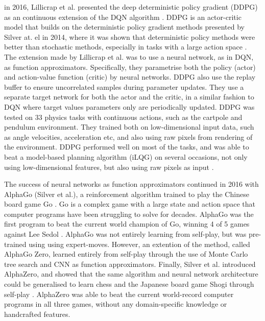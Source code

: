 \documentclass[class=book, crop=false]{standalone}
\begin{document}
in 2016, Lillicrap et al. presented the deep deterministic policy gradient (DDPG) as an continuous extension of the DQN algorithm  \cite{DBLP:journals/corr/LillicrapHPHETS15}. DDPG is an actor-critic model that builds on the deterministic policy gradient methods presented by Silver at. el in 2014, where it was shown that deterministic policy methods were better than stochastic methods, especially in tasks with a large action space \cite{pmlr-v32-silver14}. The extension made by Lillicrap et al. was to use a neural network, as in DQN, as function approximators. Specifically, they parametrise both the policy (actor) and action-value function (critic) by neural networks. DDPG also use the replay buffer to ensure uncorrelated samples during parameter updates. They use a separate target network for both the actor and the critic, in a similar fashion to DQN where target values parameters only are periodically updated. DDPG was tested on 33 physics tasks with continuous actions, such as the cartpole and pendulum  environment. They trained both on low-dimensional input data, such as angle velocities, acceleration etc, and also using raw pixels from rendering of the environment. DDPG performed well on most of the tasks, and was able to beat a model-based planning algorithm (iLQG) on several occasions, not only using low-dimensional features, but also using raw pixels as input \cite{DBLP:journals/corr/LillicrapHPHETS15}.

The success of neural networks as function approximators continued in 2016 with AlphaGo (Silver et al.), a reinforcement algorithm trained to play the Chinese board game Go \cite{alphago}. Go is a complex game with a large state and action space that computer programs have been struggling to solve for decades. AlphaGo was the first program to beat the current world champion of Go, winning 4 of 5 games against Lee Sedol \cite{Sutton1998}. AlphaGo was not entirely learning from self-play, but was pre-trained using using expert-moves. However, an extention of the method, called AlphaGo Zero, learned entirely from self-play through the use of Monte Carlo tree search and CNN as function approximators. Finally,  Silver et al. introduced AlphaZero, and showed that the same algorithm and neural network architecture could be generalised to learn chess and the Japanese board game Shogi through self-play \cite{alphazero}. AlphaZero was able to beat the current world-record computer programs in all three games, without any domain-specific knowledge or handcrafted features. 
\end{document}
